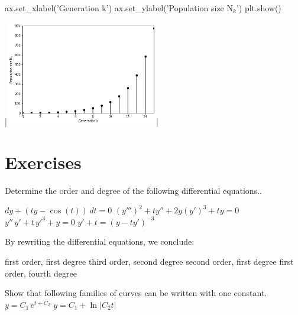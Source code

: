 \begin{example}
\begin{pyin}
ax.set_xlabel('Generation k')
ax.set_ylabel('Population size N$_k$')
plt.show()
\end{pyin}
\begin{pyout}
|\includegraphics[width=0.5\textwidth]{Malthus_Vb_Python.png}|
\end{pyout}
\fi
\end{example}

\newpage
\section{Exercises}
\renewcommand{\ExerciseListName}{Assignement}
\begin{Exercise} Determine the order and degree of the following differential equations..
	\begin{multicols}{2}
			\Question $dy + \left(ty-\cos(t)\right)\, dt=0$
			\Question $\left(y'''\right)^2+ty''+2y\left(y'\right)^3+ty=0$
			\Question $y''\,y'+t\,y'^3+y=0$ 
			\Question $y'+t=\left(y-ty'\right)^{-3}$
			\EndCurrentQuestion
	\end{multicols}

\end{Exercise}


\begin{Answer}\phantom{} 
By rewriting the differential equations, we conclude:
    \begin{multicols}{2}
	    \Question first order, first degree
	    \Question third order, second degree
	    \Question second order, first degree
	    \Question first order, fourth degree
    \EndCurrentQuestion
    \end{multicols}
\end{Answer}


\begin{Exercise} Show that following families of curves can be written with one constant.
			\Question $y=C_1\, e^{t+C_2}$
			\Question $y=C_1+\ln |C_2 t|$
			\EndCurrentQuestion
\end{Exercise}

